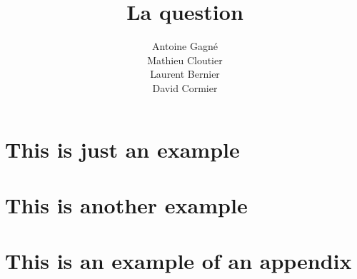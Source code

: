 \documentclass[12pt]{GDD}
\author{%
    Antoine Gagné \\%
    Mathieu Cloutier \\%
    Laurent Bernier \\%
    David Cormier%
}
\title{La question}
\begin{document}
\chapter{This is just an example}
\lipsum

\chapter{This is another example}
\lipsum

\appendix

\chapter{This is an example of an appendix}
\lipsum
\end{document}
